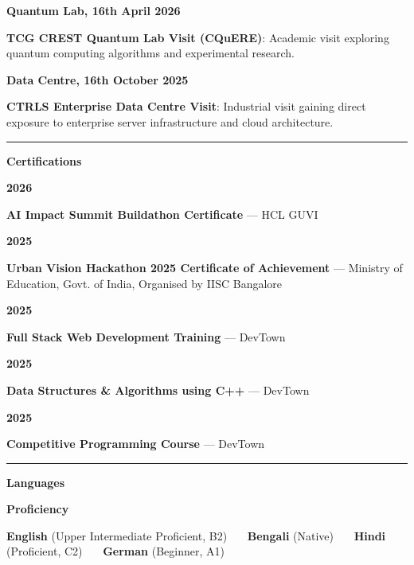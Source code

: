 \documentclass[11pt,a4paper]{article}
\newlength{\hintscolumnwidth}
\newlength{\separatorcolumnwidth}
\newlength{\maincolumnwidth}
\newcommand{\cvsection}[1]{%
  \par\vspace{10pt}%
  \needspace{5\baselineskip}%
  \phantomsection
  \noindent
  \begin{minipage}[t]{\hintscolumnwidth}
    \raggedleft
    \color{cvblue}\rule[0.3ex]{\linewidth}{3.5pt}%
  \end{minipage}%
  \hspace{\separatorcolumnwidth}%
  \begin{minipage}[t]{\maincolumnwidth}
    {\raggedright\fontsize{12.5}{14.5}\selectfont\bfseries\color{cvblue} #1}
  \end{minipage}%
  \par\nopagebreak\vspace{5pt}\nopagebreak%
}
\newcommand{\cvitem}[2]{%
  \vspace{3pt}%
  \noindent
  \begin{minipage}[t]{\hintscolumnwidth}
    \raggedleft\small\bfseries\color{cvdark} #1
  \end{minipage}%
  \hspace{\separatorcolumnwidth}%
  \begin{minipage}[t]{\maincolumnwidth}
    \raggedright\sloppy\color{cvdark} #2
  \end{minipage}%
  \par\vspace{3pt}%
}
\begin{document}
\cvitem{Quantum Lab, 16th April 2026}{\textbf{TCG CREST Quantum Lab Visit (CQuERE)}: Academic visit exploring quantum computing algorithms and experimental research.}
\cvitem{Data Centre, 16th October 2025}{\textbf{CTRLS Enterprise Data Centre Visit}: Industrial visit gaining direct exposure to enterprise server infrastructure and cloud architecture.}

\cvsection{Certifications}

\cvitem{2026}{\textbf{AI Impact Summit Buildathon Certificate} --- HCL GUVI}
\cvitem{2025}{\textbf{Urban Vision Hackathon 2025 Certificate of Achievement} --- Ministry of Education, Govt. of India, Organised by IISC Bangalore}
\cvitem{2025}{\textbf{Full Stack Web Development Training} --- DevTown}
\cvitem{2025}{\textbf{Data Structures \& Algorithms using C++} --- DevTown}
\cvitem{2025}{\textbf{Competitive Programming Course} --- DevTown}

\cvsection{Languages}

\cvitem{Proficiency}{\textbf{English} (Upper Intermediate Proficient, B2) \ \textperiodcentered\ \ \textbf{Bengali} (Native) \ \textperiodcentered\ \ \textbf{Hindi} (Proficient, C2) \ \textperiodcentered\ \ \textbf{German} (Beginner, A1)}
\end{document}
